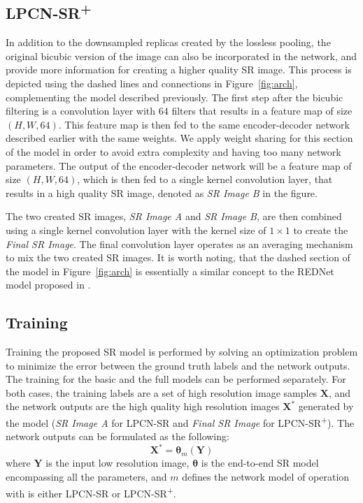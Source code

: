 \documentclass[10pt,twocolumn,letterpaper]{article}
\begin{document}
\subsection{LPCN-SR\textsuperscript{+}}
\label{total}
In addition to the downsampled replicas created by the lossless pooling, the original bicubic version of the image can also be incorporated in the network,
and provide more information for creating a higher quality SR image. This process is depicted using the dashed lines and connections in 
Figure~\ref{fig:arch}, complementing the model described previously. The first step after the bicubic filtering is a convolution layer
with 64 filters that results in a feature map of size $(H, W, 64)$. This feature map is then fed to the same encoder-decoder network described
earlier with the same weights. We apply weight sharing for this section of the model in order to avoid extra complexity and having too many 
network parameters. The output of the encoder-decoder network will be a feature map of size $(H, W, 64)$, which is then fed to a single kernel
convolution layer, that results in a high quality SR image, denoted as \emph{SR Image B} in the figure. 

The two created SR images, \emph{SR Image A} and \emph{SR Image B}, are then combined using a single kernel convolution layer with the kernel
size of $1 \times 1$ to create the \emph{Final SR Image}. The final convolution layer operates as an averaging mechanism to mix the two created
SR images. It is worth noting, that the dashed section of the model in Figure~\ref{fig:arch} is essentially a similar concept to the REDNet model 
proposed in \cite{mao2016}.

\subsection{Training}
\label{train}
Training the proposed SR model is performed by solving an optimization
problem to minimize the error between the ground truth labels and the network outputs. 
The training for the basic and the full models can be performed separately. 
For both cases, the training labels are a set of high resolution image 
samples $\mathbf{X}$, and the network outputs are the high quality high 
resolution images $\mathbf{X}^\ast$ generated by the model (\emph{SR Image A} for LPCN-SR and 
\emph{Final SR Image} for LPCN-SR\textsuperscript{+}). The network outputs can
be formulated as the following:
\begin{equation}
\label{eq:model}
\mathbf{X}^\ast = {\boldsymbol{\theta}}_m(\mathbf{Y})
\end{equation}
where $\mathbf{Y}$ is the input low resolution image, $\boldsymbol{\theta}$ is the end-to-end SR model
encompassing all the parameters, and $m$ defines the network model of operation with is either LPCN-SR or
LPCN-SR\textsuperscript{+}.
\end{document}
